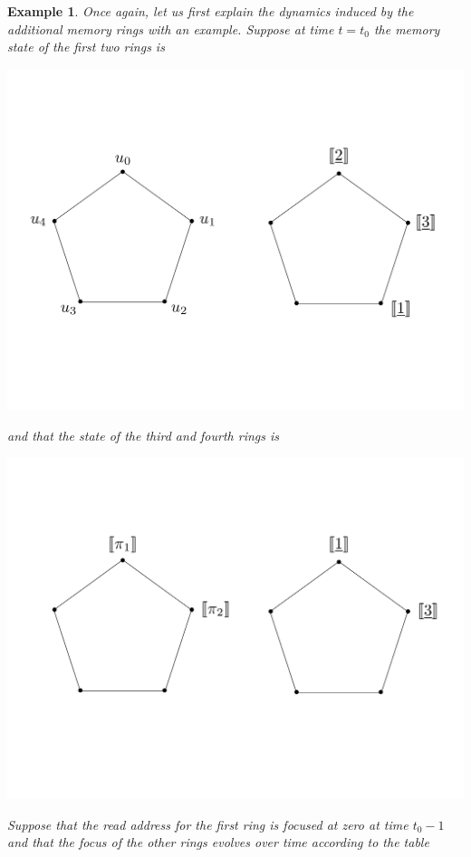 \documentclass[english,letter paper,12pt,leqno]{article}
\theoremstyle{example}
\newtheorem{example}[theorem]{Example}
\numberwithin{equation}{section}
\begin{document}
\begin{example}
Once again, let us first explain the dynamics induced by the additional memory rings with an example. Suppose at time $t = t_0$ the memory state of the first two rings is
\begin{center}
\includegraphics[scale=0.3]{dia2}
\end{center}
and that the state of the third and fourth rings is
\begin{center}
\includegraphics[scale=0.3]{dia3}
\end{center}
Suppose that the read address for the first ring is focused at zero at time $t_0 -1$ and that the focus of the other rings evolves over time according to the table
\begin{center}
\begin{tabular}{|r|c|c|c|c|c|c|c|}

\end{tabular}
\end{center}
\end{example}
\end{document}
